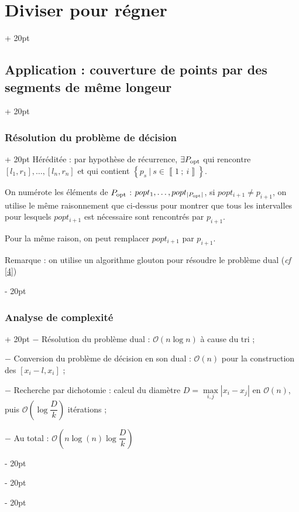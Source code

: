 \documentclass[a4paper, 12pt, twoside]{article}
\newcommand{\nset}[2]{\left\llbracket #1\ ;\ #2 \right\rrbracket}
\newcommand{\lr}[1]{\left( #1 \right)}
\newcommand{\set}[1]{\left\{ #1 \right\}}
\newcommand{\abs}[1]{\left\lvert #1 \right\rvert} %
\newcommand{\ind}[1][20pt]{\advance\leftskip + #1}
\newcommand{\deind}[1][20pt]{\advance\leftskip - #1}
\newenvironment{indt}[2][20pt]{#2 \par \ind[#1]}{\par \deind} %
\begin{document}
\begin{indt}{\section{Diviser pour régner}}
\begin{indt}{\subsection{Application : couverture de points par des segments de même longeur}}
\begin{indt}{\subsubsection{Résolution du problème de décision}}
                Héréditée : par hypothèse de récurrence, $\exists P_{\rm opt}$ qui rencontre $[l_1, r_1], \ldots, [l_n, r_n]$ et qui contient $\set{p_s\ |\ s \in \nset 1 i}$.
                
                On numérote les éléments de $P_{\rm opt}$ : $popt_1, \ldots, popt_{\abs{P_{\rm opt}}}$, si $popt_{i + 1} \neq p_{i + 1}$, on utilise le même raisonnement que ci-dessus pour montrer que tous les intervalles pour lesquels $popt_{i + 1}$ est nécessaire sont rencontrés par $p_{i + 1}$.
                
                Pour la même raison, on peut remplacer $popt_{i + 1}$ par $p_{i + 1}$.
                
                \vspace{12pt}
                
                Remarque : on utilise un algorithme glouton pour résoudre le problème dual (\textit{cf} \ref{4})
            \end{indt}
            
            \vspace{12pt}
            
            \begin{indt}{\subsubsection{Analyse de complexité}}
                $-$ Résolution du problème dual : $\mathcal O(n\log n)$ à cause du tri ;
                
                $-$ Conversion du problème de décision en son dual : $\mathcal O(n)$ pour la construction des $[x_i - l, x_i]$ ;
                
                $-$ Recherche par dichotomie : calcul du diamètre $D = \max\limits_{i, j}\abs{x_i - x_j}$ en $\mathcal O(n)$, puis $\mathcal O\lr{\log \dfrac D k}$ itérations ;
                
                $-$ Au total : $\mathcal O\lr{n\log(n) \log \dfrac D k}$
            \end{indt}
        \end{indt}
        
    \end{indt}
    
    \vspace{12pt}
    
\end{document}
